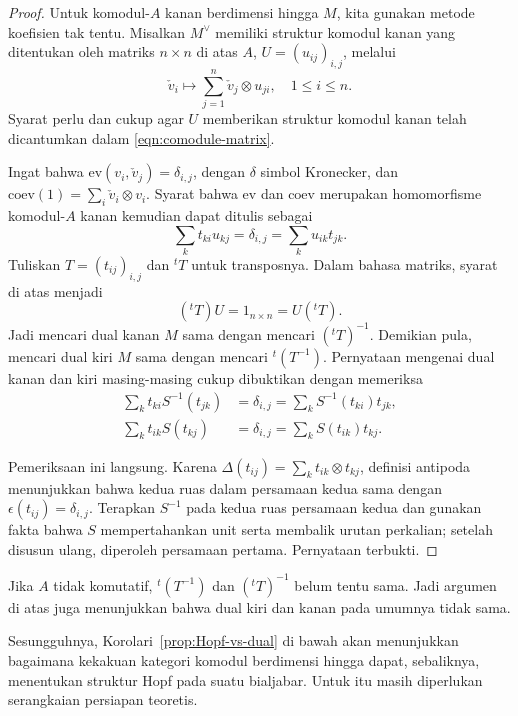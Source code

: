 \begin{proof}
	Untuk komodul-$A$ kanan berdimensi hingga $M$, kita gunakan metode
	koefisien tak tentu. Misalkan $M^\vee$ memiliki struktur komodul kanan
	yang ditentukan oleh matriks $n\times n$ di atas $A$,
	$U=(u_{ij})_{i,j}$, melalui
	\[ \check{v}_i \mapsto \sum_{j=1}^n \check{v}_j \otimes u_{ji}, \quad 1 \leq i \leq n. \]
	Syarat perlu dan cukup agar $U$ memberikan struktur komodul kanan telah
	dicantumkan dalam \eqref{eqn:comodule-matrix}.

	Ingat bahwa
	$\mathrm{ev}(v_i,\check v_j)=\delta_{i,j}$, dengan $\delta$ simbol
	Kronecker, dan $\mathrm{coev}(1)=\sum_i\check v_i\otimes v_i$. Syarat
	bahwa $\mathrm{ev}$ dan $\mathrm{coev}$ merupakan homomorfisme
	komodul-$A$ kanan kemudian dapat ditulis sebagai
	\begin{equation}\label{eqn:Hopf-module-dual-aux}
		\sum_k t_{ki} u_{kj} = \delta_{i, j} = \sum_k u_{ik} t_{jk}.
	\end{equation}
	Tuliskan $T=(t_{ij})_{i,j}$ dan ${}^tT$ untuk transposnya. Dalam bahasa
	matriks, syarat di atas menjadi
	\[ ({}^t T) U = 1_{n \times n} = U ({}^t T). \]
	Jadi mencari dual kanan $M$ sama dengan mencari $({}^tT)^{-1}$.
	Demikian pula, mencari dual kiri $M$ sama dengan mencari
	${}^t(T^{-1})$. Pernyataan mengenai dual kanan dan kiri masing-masing
	cukup dibuktikan dengan memeriksa
	\begin{align*}
		\sum_k t_{ki} S^{-1}(t_{jk}) & = \delta_{i, j} = \sum_k S^{-1} (t_{ki}) t_{jk}, \\
		\sum_k t_{ik} S(t_{kj}) & = \delta_{i, j} = \sum_k S(t_{ik}) t_{kj}.
	\end{align*}

	Pemeriksaan ini langsung. Karena
	$\Delta(t_{ij})=\sum_k t_{ik}\otimes t_{kj}$, definisi antipoda
	menunjukkan bahwa kedua ruas dalam persamaan kedua sama dengan
	$\epsilon(t_{ij})=\delta_{i,j}$. Terapkan $S^{-1}$ pada kedua ruas
	persamaan kedua dan gunakan fakta bahwa $S$ mempertahankan unit serta
	membalik urutan perkalian; setelah disusun ulang, diperoleh persamaan
	pertama. Pernyataan terbukti.
\end{proof}

Jika $A$ tidak komutatif, ${}^t(T^{-1})$ dan $({}^tT)^{-1}$ belum tentu
sama. Jadi argumen di atas juga menunjukkan bahwa dual kiri dan kanan pada
umumnya tidak sama.

Sesungguhnya, Korolari~\ref{prop:Hopf-vs-dual} di bawah akan menunjukkan
bagaimana kekakuan kategori komodul berdimensi hingga dapat, sebaliknya,
menentukan struktur Hopf pada suatu bialjabar. Untuk itu masih diperlukan
serangkaian persiapan teoretis.
